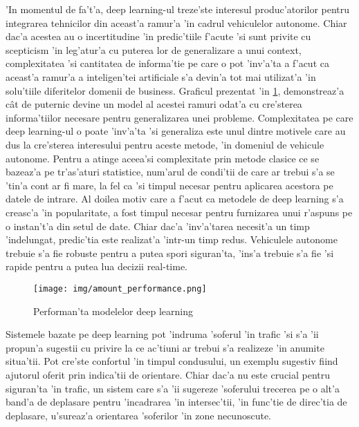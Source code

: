\documentclass[12pt,a4paper,twoside]{report}
\begin{document}
'In momentul de fa't'a, deep learning-ul treze'ste interesul produc'atorilor pentru integrarea tehnicilor din aceast'a ramur'a 'in cadrul vehiculelor autonome. Chiar dac'a acestea au o incertitudine 'in predic'tiile f'acute 'si sunt privite cu scepticism 'in leg'atur'a cu puterea lor de generalizare a unui context, complexitatea 'si cantitatea de informa'tie pe care o pot 'inv'a'ta a f'acut ca aceast'a ramur'a a inteligen'tei artificiale s'a devin'a tot mai utilizat'a 'in solu'tiile diferitelor domenii de business. Graficul prezentat 'in \ref{fig:deep_learning}, demonstreaz'a c\^at de puternic devine un model al acestei ramuri odat'a cu cre'sterea informa'tiilor necesare pentru generalizarea unei probleme. Complexitatea pe care deep learning-ul o poate 'inv'a'ta 'si generaliza este unul dintre motivele care au dus la cre'sterea interesului pentru aceste metode, 'in domeniul de vehicule autonome. Pentru a atinge aceea'si complexitate prin metode clasice ce se bazeaz'a pe tr'as'aturi statistice, num'arul de condi'tii de care ar trebui s'a se 'tin'a cont ar fi mare, la fel ca 'si timpul necesar pentru aplicarea acestora pe datele de intrare. Al doilea motiv care a f'acut ca metodele de deep learning s'a creasc'a 'in popularitate, a fost timpul necesar pentru furnizarea unui r'aspuns pe o instan't'a din setul de date. Chiar dac'a 'inv'a'tarea necesit'a un timp 'indelungat, predic'tia este realizat'a 'intr-un timp redus. Vehiculele autonome trebuie s'a fie robuste pentru a putea spori siguran'ta, 'ins'a trebuie s'a fie 'si rapide pentru a putea lua decizii real-time.

\begin{figure}[H]
  \texttt{[image: img/amount\_performance.png]}
  \centering
  \caption{Performan'ta modelelor deep learning\protect\footnotemark}
  \label{fig:deep_learning}
\end{figure}

Sistemele bazate pe deep learning pot 'indruma 'soferul 'in trafic 'si s'a 'ii propun'a sugestii cu privire la ce ac'tiuni ar trebui s'a realizeze 'in anumite situa'tii. Pot cre'ste confortul 'in timpul condusului, un exemplu sugestiv fiind ajutorul oferit prin indica'tii de orientare. Chiar dac'a nu este crucial pentru siguran'ta 'in trafic, un sistem care s'a 'ii sugereze 'soferului trecerea pe o alt'a band'a de deplasare pentru 'incadrarea 'in intersec'tii, 'in func'tie de direc'tia de deplasare, u'sureaz'a orientarea 'soferilor 'in zone necunoscute.
\end{document}

